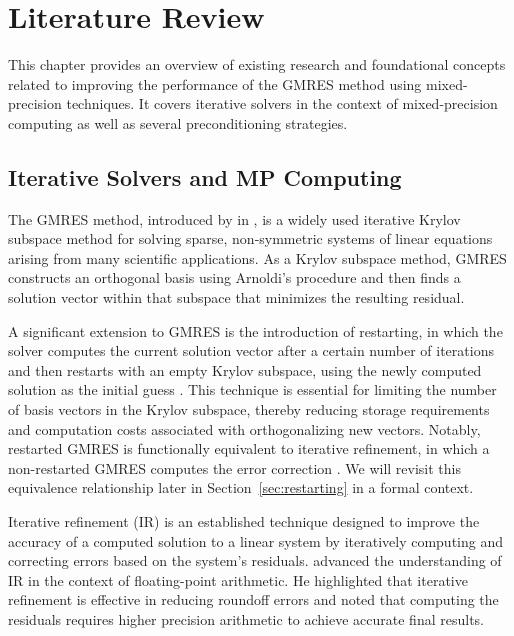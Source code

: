 \chapter{Literature Review}
\label{cha:literature-review}

This chapter provides an overview of existing research and foundational concepts
related to improving the performance of the GMRES method using mixed-precision
techniques. It covers iterative solvers in the context of mixed-precision
computing as well as several preconditioning strategies.

\section{Iterative Solvers and MP Computing}
\label{sec:iterative-solvers}

The GMRES method, introduced by \textcite{saad_gmres_1986} in
\citeyear{saad_gmres_1986}, is a widely used iterative Krylov subspace method
for solving sparse, non-symmetric systems of linear equations arising from many
scientific applications. As a Krylov subspace method, GMRES constructs an
orthogonal basis using Arnoldi’s procedure and then finds a solution vector
within that subspace that minimizes the resulting residual.

A significant extension to GMRES is the introduction of restarting, in which the
solver computes the current solution vector after a certain number of iterations
and then restarts with an empty Krylov subspace, using the newly computed
solution as the initial guess \cite{lindquist_improving_2020}. This technique is
essential for limiting the number of basis vectors in the Krylov subspace,
thereby reducing storage requirements and computation costs associated with
orthogonalizing new vectors. Notably, restarted GMRES is functionally equivalent
to iterative refinement, in which a non-restarted GMRES computes the error
correction \cite{lindquist_improving_2020,mary_mixed_2023}. We will revisit this
equivalence relationship later in Section~\ref{sec:restarting} in a formal
context.

Iterative refinement (IR) is an established technique designed to improve the
accuracy of a computed solution to a linear system by iteratively computing and
correcting errors based on the system's residuals.
\textcite{moler_iterative_1967} advanced the understanding of IR in the context
of floating-point arithmetic. He highlighted that iterative refinement is
effective in reducing roundoff errors and noted that computing the residuals
requires higher precision arithmetic to achieve accurate final results.

